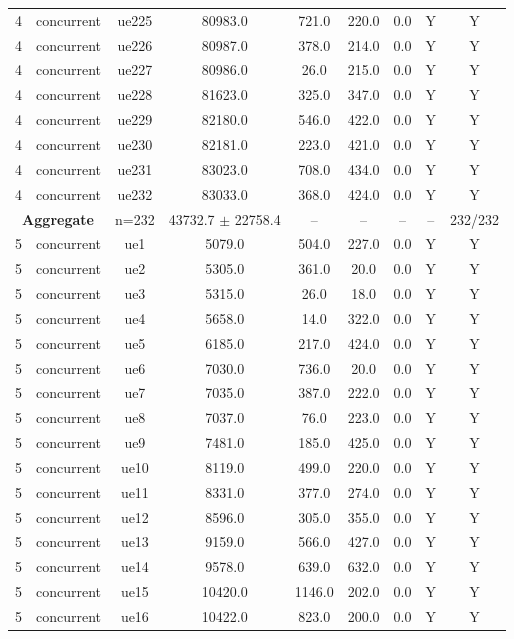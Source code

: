 \begin{table}[ht]
\begin{tabular}{|c|c|c|c|c|c|c|c|c|}
4 & concurrent & ue225 & 80983.0 & 721.0 & 220.0 & 0.0 & Y & Y \\
4 & concurrent & ue226 & 80987.0 & 378.0 & 214.0 & 0.0 & Y & Y \\
4 & concurrent & ue227 & 80986.0 & 26.0 & 215.0 & 0.0 & Y & Y \\
4 & concurrent & ue228 & 81623.0 & 325.0 & 347.0 & 0.0 & Y & Y \\
4 & concurrent & ue229 & 82180.0 & 546.0 & 422.0 & 0.0 & Y & Y \\
4 & concurrent & ue230 & 82181.0 & 223.0 & 421.0 & 0.0 & Y & Y \\
4 & concurrent & ue231 & 83023.0 & 708.0 & 434.0 & 0.0 & Y & Y \\
4 & concurrent & ue232 & 83033.0 & 368.0 & 424.0 & 0.0 & Y & Y \\
\multicolumn{2}{|c|}{\textbf{Aggregate}} & n=232 & 43732.7 $\pm$ 22758.4 & -- & -- & -- & -- & 232/232 \\
\hline
5 & concurrent & ue1 & 5079.0 & 504.0 & 227.0 & 0.0 & Y & Y \\
5 & concurrent & ue2 & 5305.0 & 361.0 & 20.0 & 0.0 & Y & Y \\
5 & concurrent & ue3 & 5315.0 & 26.0 & 18.0 & 0.0 & Y & Y \\
5 & concurrent & ue4 & 5658.0 & 14.0 & 322.0 & 0.0 & Y & Y \\
5 & concurrent & ue5 & 6185.0 & 217.0 & 424.0 & 0.0 & Y & Y \\
5 & concurrent & ue6 & 7030.0 & 736.0 & 20.0 & 0.0 & Y & Y \\
5 & concurrent & ue7 & 7035.0 & 387.0 & 222.0 & 0.0 & Y & Y \\
5 & concurrent & ue8 & 7037.0 & 76.0 & 223.0 & 0.0 & Y & Y \\
5 & concurrent & ue9 & 7481.0 & 185.0 & 425.0 & 0.0 & Y & Y \\
5 & concurrent & ue10 & 8119.0 & 499.0 & 220.0 & 0.0 & Y & Y \\
5 & concurrent & ue11 & 8331.0 & 377.0 & 274.0 & 0.0 & Y & Y \\
5 & concurrent & ue12 & 8596.0 & 305.0 & 355.0 & 0.0 & Y & Y \\
5 & concurrent & ue13 & 9159.0 & 566.0 & 427.0 & 0.0 & Y & Y \\
5 & concurrent & ue14 & 9578.0 & 639.0 & 632.0 & 0.0 & Y & Y \\
5 & concurrent & ue15 & 10420.0 & 1146.0 & 202.0 & 0.0 & Y & Y \\
5 & concurrent & ue16 & 10422.0 & 823.0 & 200.0 & 0.0 & Y & Y \\

\end{tabular}
\end{table}

